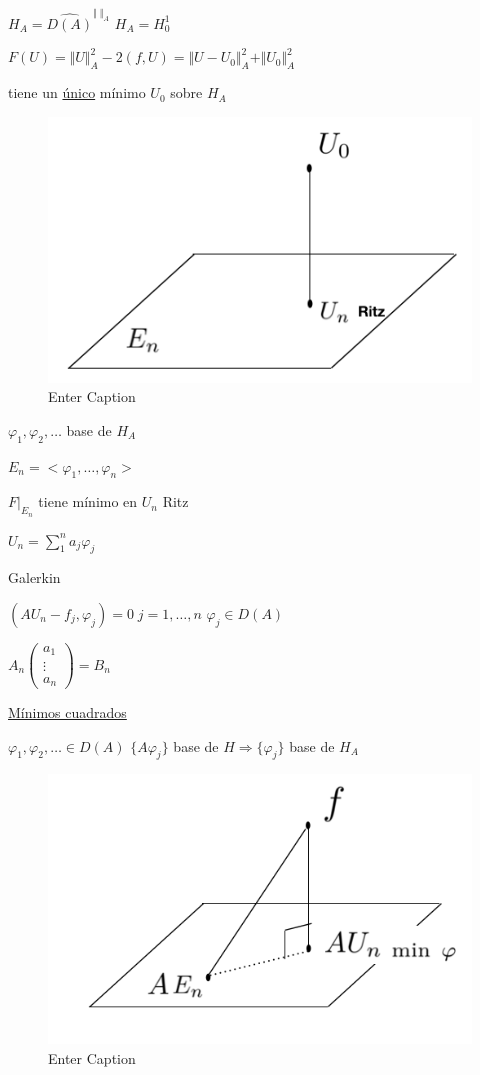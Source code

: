 \documentclass[a4paper,10pt]{book}
\begin{document}
\begin{enumerate}
$H_A= \widehat{D(A)}^{\Vert\;\Vert_A} $  $H_A=H_0^1$

$F(U) = \Vert U \Vert_A^2 -2 (f,U) = \Vert U-U_0 \Vert_A^2 + \Vert U_0\Vert_A^2$

tiene un \underline{único} mínimo $U_0$ sobre $H_A$

\begin{figure}[H]
    \centering
    \includegraphics[width=0.5\linewidth]{Screen Shot 2024-03-26 at 09.44.11.png}
    \caption{Enter Caption}
    \label{fig:8}
\end{figure}

$\varphi_1, \varphi_2 , \ldots $ base de $H_A$

$E_n = < \varphi_1, \ldots,\varphi_n >  $

$F|_{E_n}$ tiene mínimo en $U_n$ Ritz

$U_n= \sum\limits_1^n a_j \varphi_j $

Galerkin 

$(AU_n-f_j,\varphi_j)=0  \;j=1,\ldots,n$  $\varphi_j\in D(A)$

$ A_n \left(  \begin{array}{c}
a_1\\
\vdots\\
a_n
\end{array}
\right) = B_n $

\underline{Mínimos cuadrados}

$\varphi_1,\varphi_2,\ldots\in D(A)$ $\{ A \varphi_j \}$ base de $H\Rightarrow \{ \varphi_j\}$ base de $H_A$

\begin{figure}
    \centering
    \includegraphics[width=0.5\linewidth]{Screen Shot 2024-03-26 at 19.24.50.png}
    \caption{Enter Caption}
    \label{fig:9}
\end{figure}


\end{enumerate}
\end{document}
